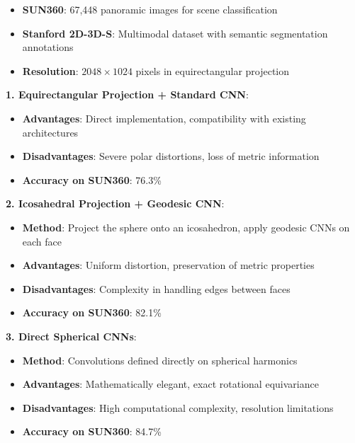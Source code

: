 \begin{itemize}
    \item \textbf{SUN360}: 67,448 panoramic images for scene classification
    \item \textbf{Stanford 2D-3D-S}: Multimodal dataset with semantic segmentation annotations
    \item \textbf{Resolution}: $2048 \times 1024$ pixels in equirectangular projection
\end{itemize}

\begin{example}

\textbf{1. Equirectangular Projection + Standard CNN}:
\begin{itemize}
    \item \textbf{Advantages}: Direct implementation, compatibility with existing architectures
    \item \textbf{Disadvantages}: Severe polar distortions, loss of metric information
    \item \textbf{Accuracy on SUN360}: 76.3\%
\end{itemize}

\textbf{2. Icosahedral Projection + Geodesic CNN}:
\begin{itemize}
    \item \textbf{Method}: Project the sphere onto an icosahedron, apply geodesic CNNs on each face
    \item \textbf{Advantages}: Uniform distortion, preservation of metric properties
    \item \textbf{Disadvantages}: Complexity in handling edges between faces
    \item \textbf{Accuracy on SUN360}: 82.1\%
\end{itemize}

\textbf{3. Direct Spherical CNNs}:
\begin{itemize}
    \item \textbf{Method}: Convolutions defined directly on spherical harmonics
    \item \textbf{Advantages}: Mathematically elegant, exact rotational equivariance
    \item \textbf{Disadvantages}: High computational complexity, resolution limitations
    \item \textbf{Accuracy on SUN360}: 84.7\%
\end{itemize}
\end{example}

